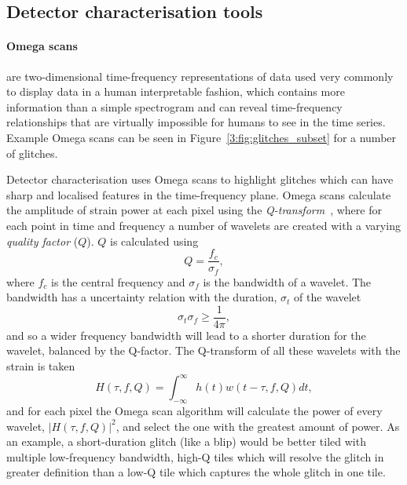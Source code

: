 \subsection{\label{3:sec:detchar-tools}Detector characterisation tools}

\paragraph{Omega scans}

are two-dimensional time-frequency representations of \gwadj data used very commonly to display \gwadj data in a human interpretable fashion, which contains more information than a simple spectrogram and can reveal time-frequency relationships that are virtually impossible for humans to see in the time series. Example Omega scans can be seen in Figure~\ref{3:fig:glitches_subset} for a number of glitches.

Detector characterisation uses Omega scans to highlight glitches which can have sharp and localised features in the time-frequency plane. Omega scans calculate the amplitude of strain power at each pixel using the \textit{Q-transform}~\cite{qscan:2004}, where for each point in time and frequency a number of wavelets are created with a varying \textit{quality factor} ($Q$). $Q$ is calculated using
%
\begin{equation}
    Q = \frac{f_{c}}{\sigma_{f}},
\end{equation}
%
where $f_{c}$ is the central frequency and $\sigma_{f}$ is the bandwidth of a wavelet. The bandwidth has a uncertainty relation with the duration, $\sigma_{t}$ of the wavelet
%
\begin{equation}
    \sigma_{t} \sigma_{f} \ge \frac{1}{4\pi},
\end{equation}
%
and so a wider frequency bandwidth will lead to a shorter duration for the wavelet, balanced by the Q-factor. The Q-transform of all these wavelets with the \gwadj strain is taken
%
\begin{equation}
    H(\tau, f, Q) = \int^{\infty}_{-\infty} h(t) w(t - \tau, f, Q) dt,
\end{equation}
%
and for each pixel the Omega scan algorithm will calculate the power of every wavelet, $|H(\tau, f, Q)|^{2}$, and select the one with the greatest amount of power. As an example, a short-duration glitch (like a blip) would be better tiled with multiple low-frequency bandwidth, high-Q tiles which will resolve the glitch in greater definition than a low-Q tile which captures the whole glitch in one tile.


